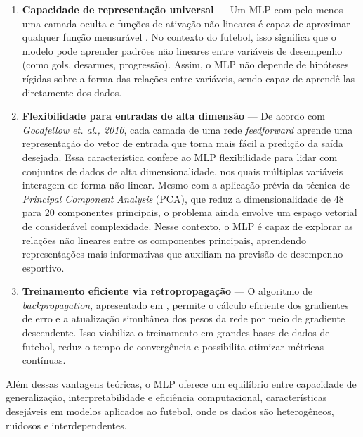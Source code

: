 \begin{enumerate}
    \item \textbf{Capacidade de representação universal} —
    Um MLP com pelo menos uma camada oculta e funções de ativação não lineares é capaz de aproximar qualquer função mensurável \cite{Hornik1991}.
    No contexto do futebol, isso significa que o modelo pode aprender padrões não lineares entre variáveis de desempenho (como gols, desarmes, progressão). 
    Assim, o MLP não depende de hipóteses rígidas sobre a forma das relações entre variáveis, sendo capaz de aprendê-las diretamente dos dados.

    \item \textbf{Flexibilidade para entradas de alta dimensão} —
    De acordo com \textit{Goodfellow et. al., 2016}, cada camada de uma rede \textit{feedforward} aprende uma representação do vetor de entrada que torna 
    mais fácil a predição da saída desejada. 
    Essa característica confere ao MLP flexibilidade para lidar com conjuntos de dados de alta dimensionalidade, nos quais múltiplas variáveis interagem de forma não linear. 
    Mesmo com a aplicação prévia da técnica de \textit{Principal Component Analysis} (PCA), que reduz a dimensionalidade de 48 para 20 componentes principais, 
    o problema ainda envolve um espaço vetorial de considerável complexidade. 
    Nesse contexto, o MLP é capaz de explorar as relações não lineares entre os componentes principais, aprendendo representações 
    mais informativas que auxiliam na previsão de desempenho esportivo.

    \item \textbf{Treinamento eficiente via retropropagação} — 
    O algoritmo de \textit{backpropagation}, apresentado em \cite{Goodfellow2016}, permite o cálculo eficiente dos gradientes de erro e a atualização 
    simultânea dos pesos da rede por meio de gradiente descendente. 
    Isso viabiliza o treinamento em grandes bases de dados de futebol, reduz o tempo de convergência e possibilita otimizar métricas contínuas.
\end{enumerate}

Além dessas vantagens teóricas, o MLP oferece um equilíbrio entre capacidade de generalização, interpretabilidade e eficiência computacional, características 
desejáveis em modelos aplicados ao futebol, onde os dados são heterogêneos, ruidosos e interdependentes.

